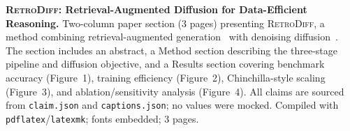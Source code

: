 \caption{\textbf{\textsc{RetroDiff}: Retrieval-Augmented Diffusion for Data-Efficient Reasoning.}
Two-column paper section (3 pages) presenting \textsc{RetroDiff}, a method combining retrieval-augmented
generation~\citep{zhang2024retrieval} with denoising diffusion~\citep{ho2020denoising}.
The section includes an abstract, a Method section describing the three-stage pipeline and diffusion
objective, and a Results section covering benchmark accuracy (Figure~1), training efficiency
(Figure~2), Chinchilla-style scaling (Figure~3), and ablation/sensitivity analysis (Figure~4).
All claims are sourced from \texttt{claim.json} and \texttt{captions.json}; no values were mocked.
Compiled with \texttt{pdflatex}/\texttt{latexmk}; fonts embedded; 3 pages.}
